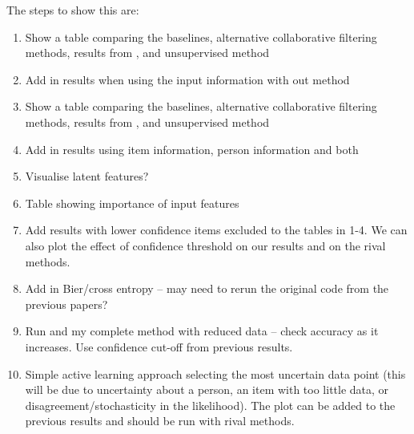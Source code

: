 The steps to show this are:
\begin{enumerate}
  \item Show a table comparing the baselines, alternative collaborative filtering methods, 
  results from \cite{habernal2016argument}, and unsupervised method
  \item Add in results when using the input information with out method
  \item Show a table comparing the baselines, alternative collaborative filtering methods, 
  results from \cite{lukin2017argument}, and unsupervised method
  \item Add in results using item information, person information and both
  \item Visualise latent features?
  \item Table showing importance of input features
  \item Add results with lower confidence items excluded to the tables in 1-4. We can also plot the
  effect of confidence threshold on our results and on the rival methods.
  \item Add in Bier/cross entropy -- may need to rerun the original code from the previous papers?
  \item Run \cite{habernal2016argument} and my complete method with reduced data -- check accuracy as it increases. Use confidence cut-off from previous results.
  \item Simple active learning approach selecting the most uncertain data point (this will be due to 
  uncertainty about a person, an item with too little data, or disagreement/stochasticity in the likelihood). The plot can be added to the previous results and should be run with rival methods.
\end{enumerate}

